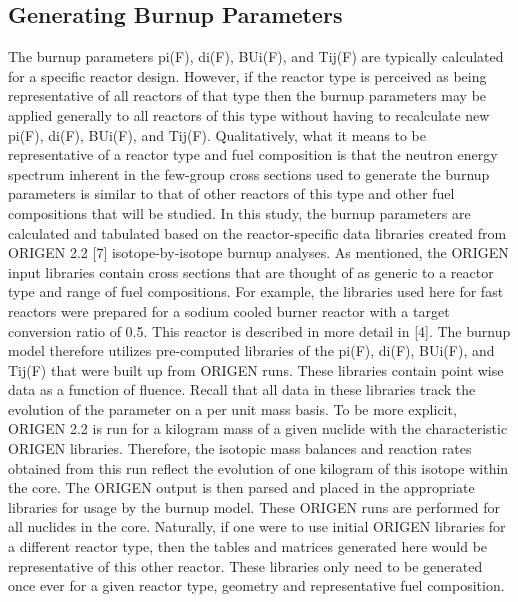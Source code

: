 \subsection{Generating Burnup Parameters}
\label{1g_sec:gen_BU_param}
The burnup parameters pi(F), di(F), BUi(F), and Tij(F) are typically calculated for a specific reactor design.  However, if the reactor type is perceived as being representative of all reactors of that type then the burnup parameters may be applied generally to all reactors of this type without having to recalculate new pi(F), di(F), BUi(F), and Tij(F).  Qualitatively, what it means to be representative of a reactor type and fuel composition is that the neutron energy spectrum inherent in the few-group cross sections used to generate the burnup parameters is similar to that of other reactors of this type and other fuel compositions that will be studied.   
In this study, the burnup parameters are calculated and tabulated based on the reactor-specific data libraries created from ORIGEN 2.2 [7] isotope-by-isotope burnup analyses.  As mentioned, the ORIGEN input libraries contain cross sections that are thought of as generic to a reactor type and range of fuel compositions.  For example, the libraries used here for fast reactors were prepared for a sodium cooled burner reactor with a target conversion ratio of 0.5.  This reactor is described in more detail in [4].  The burnup model therefore utilizes pre-computed libraries of the pi(F), di(F), BUi(F), and Tij(F) that were built up from ORIGEN runs.  These libraries contain point wise data as a function of fluence.  Recall that all data in these libraries track the evolution of the parameter on a per unit mass basis.
To be more explicit, ORIGEN 2.2 is run for a kilogram mass of a given nuclide with the characteristic ORIGEN libraries.  Therefore, the isotopic mass balances and reaction rates obtained from this run reflect the evolution of one kilogram of this isotope within the core.  The ORIGEN output is then parsed and placed in the appropriate libraries for usage by the burnup model.  These ORIGEN runs are performed for all nuclides in the core.  Naturally, if one were to use initial ORIGEN libraries for a different reactor type, then the tables and matrices generated here would be representative of this other reactor.  These libraries only need to be generated once ever for a given reactor type, geometry and representative fuel composition.
